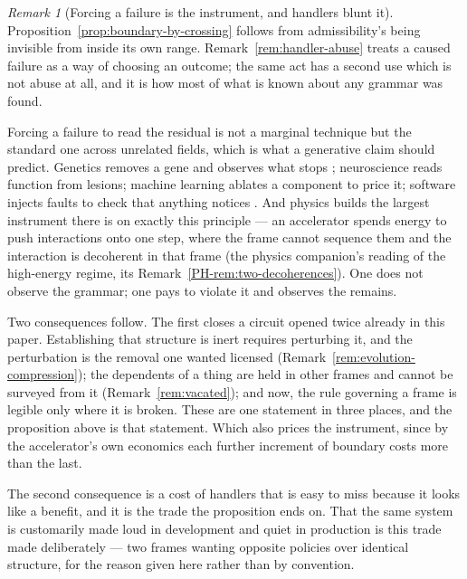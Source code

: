 \documentclass[11pt,a4paper]{article}
\theoremstyle{remark}\newtheorem{remark}[definition]{Remark}
\begin{document}
\begin{remark}[Forcing a failure is the instrument, and handlers blunt it]\label{rem:failure-instrument}
Proposition~\ref{prop:boundary-by-crossing} follows from admissibility's being invisible from inside
its own range. Remark~\ref{rem:handler-abuse} treats a caused failure as a way of choosing an
outcome; the same act has a second use which is not abuse at all, and it is how most of what is known
about any grammar was found.

Forcing a failure to read the residual is not a marginal technique but the standard one across
unrelated fields, which is what a generative claim should predict. Genetics removes a gene and observes what stops
\citep{capecchi1989}; neuroscience reads function from lesions; machine learning ablates a component
to price it; software injects faults to check that anything notices \citep{basiri2016}. And physics
builds the largest instrument there is on exactly this principle --- an accelerator spends energy to
push interactions onto one step, where the frame cannot sequence them and the interaction is decoherent
in that frame (the physics companion's reading of the high-energy regime, its Remark~\ref{PH-rem:two-decoherences}). One does not observe the
grammar; one pays to violate it and observes the remains.

Two consequences follow. The first closes a circuit opened twice already in this
paper. Establishing that structure is inert requires perturbing it, and the perturbation is the removal
one wanted licensed (Remark~\ref{rem:evolution-compression}); the dependents of a thing are held in
other frames and cannot be surveyed from it (Remark~\ref{rem:vacated}); and now, the rule governing a
frame is legible only where it is broken. These are one statement in three places, and the proposition
above is that statement. Which also prices the instrument, since by the accelerator's
own economics each further increment of boundary costs more than the last.

The second consequence is a cost of handlers that is easy to miss because it looks like a benefit,
and it is the trade the proposition ends on. That the same system is customarily made loud in development
and quiet in production is this trade made deliberately --- two frames wanting opposite policies over
identical structure, for the reason given here rather than by convention.
\end{remark}
\end{document}
